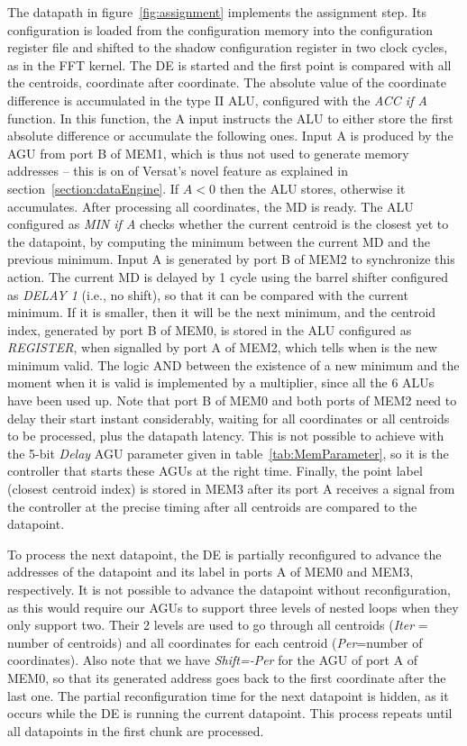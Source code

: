 The datapath in figure~\ref{fig:assignment} implements the assignment
step. Its configuration is loaded from the configuration memory into
the configuration register file and shifted to the shadow
configuration register in two clock cycles, as in the FFT kernel. The
DE is started and the first point is compared with all the centroids,
coordinate after coordinate. The absolute value of the coordinate
difference is accumulated in the type II ALU, configured with the {\em
  ACC if A} function. In this function, the A input instructs the ALU
to either store the first absolute difference or accumulate the
following ones. Input A is produced by the AGU from port B of MEM1,
which is thus not used to generate memory addresses -- this is on of
Versat's novel feature as explained in
section~\ref{section:dataEngine}. If $A < 0$ then the ALU stores,
otherwise it accumulates. After processing all coordinates, the MD is
ready. The ALU configured as {\em MIN if A} checks whether the current
centroid is the closest yet to the datapoint, by computing the minimum
between the current MD and the previous minimum. Input A is generated
by port B of MEM2 to synchronize this action. The current MD is
delayed by 1 cycle using the barrel shifter configured as {\em DELAY
  1} (i.e., no shift), so that it can be compared with the current
minimum. If it is smaller, then it will be the next minimum, and the
centroid index, generated by port B of MEM0, is stored in the ALU
configured as {\em REGISTER}, when signalled by port A of MEM2, which
tells when is the new minimum valid. The logic AND between the
existence of a new minimum and the moment when it is valid is
implemented by a multiplier, since all the 6 ALUs have been used
up. Note that port B of MEM0 and both ports of MEM2 need to delay
their start instant considerably, waiting for all coordinates or all
centroids to be processed, plus the datapath latency. This is not
possible to achieve with the 5-bit {\em Delay} AGU parameter given in
table~\ref{tab:MemParameter}, so it is the controller that starts
these AGUs at the right time. Finally, the point label (closest
centroid index) is stored in MEM3 after its port A receives a signal
from the controller at the precise timing after all centroids are
compared to the datapoint.

To process the next datapoint, the DE is partially reconfigured to
advance the addresses of the datapoint and its label in ports A of
MEM0 and MEM3, respectively. It is not possible to advance the
datapoint without reconfiguration, as this would require our AGUs to
support three levels of nested loops when they only support two. Their
2 levels are used to go through all centroids ({\em Iter} = number of
centroids) and all coordinates for each centroid ({\em Per}=number of
coordinates). Also note that we have {\em Shift=-Per} for the AGU of
port A of MEM0, so that its generated address goes back to the first
coordinate after the last one. The partial reconfiguration time for
the next datapoint is hidden, as it occurs while the DE is running the
current datapoint. This process repeats until all datapoints in the
first chunk are processed.

